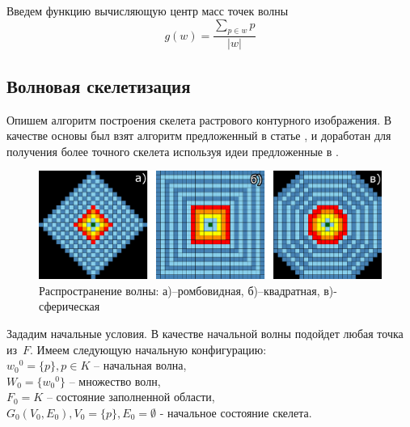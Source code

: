 Введем функцию вычисляющую центр масс точек волны 
$$g(w)=\dfrac{\sum\limits_{p\in w} p}{\lvert w\rvert}$$

\subsection{Волновая скелетизация}
Опишем алгоритм построения скелета растрового контурного изображения. В качестве основы был взят алгоритм предложенный в статье \cite{ocrai}, и доработан для получения более точного скелета используя идеи предложенные в \cite{topology_skeleton}.

\begin{figure}[h]
\centering
\includegraphics[width=\linewidth,keepaspectratio]{images/th_wave}
\caption{Распространение волны: а)--ромбовидная, б)--квадратная, в)-сферическая }
\end{figure}

Зададим начальные условия. В качестве начальной волны подойдет любая точка из~$F$. 
Имеем следующую начальную конфигурацию:\\
${{w_0}^0} = \{p\}, p\in K$ -- начальная волна,\\
$W_0 = \{{w_0}^0\}$  -- множество волн,\\
$F_0 = K$ -- состояние заполненной области,\\
$G_0(V_0,E_0), V_0=\{p\}, E_0=\emptyset$ - начальное состояние скелета.\\

